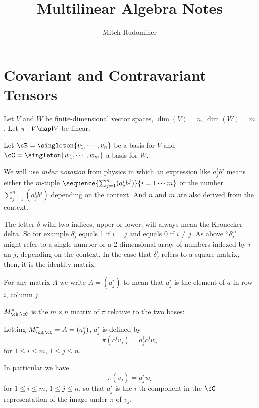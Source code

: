 \documentclass[oneside,12pt]{amsart}
\begin{document}
\title{Multilinear Algebra Notes}
\author{Mitch Rudominer}

\maketitle

\tableofcontents


\section{Covariant and Contravariant Tensors}

Let $V$ and $W$ be finite-dimensional vector spaces, 
$\dim(V)=n$, $\dim(W) = m$. Let $\pi:V\map W$ be linear.

Let $\cB = \singleton{v_1,\cdots,v_n}$ be a basis for $V$ and
$\cC=\singleton{w_1,\cdots,w_m}$ a basis for $W$.

We will use \emph{index notation} from physics in which an expression
like $a^i_j b^j$ means either the $m$-tuple 
$\sequence{\sum_{j=1}^n(a^i_j b^j)}{i=1\cdots m}$
or the number $\sum_{j=1}^n(a^i_j b^j)$ depending on the context. 
And $n$ and $m$ are also derived from the context.

The letter $\delta$ with two indices, upper or lower, will always mean the Kronecker delta. So for example $\delta^i_j$ equals 1 if $i=j$ and equals 0 if $i\neq j$. 
As above ``$\delta^i_j$" might refer to a single number or a 2-dimensional array
of numbers indexed by $i$ an $j$, depending on the context. In the case that
$\delta^i_j$ refers to a square matrix, then, it is the identity matrix.


\begin{definition}
 For any matrix $A$ we write $A=(a^i_j)$ to mean that $a^i_j$ is the
 element of $a$ in row $i$, column $j$. 
\end{definition}


\begin{definition}
$M^{\pi}_{\cB,\cC}$ is the $m\times n$ matrix of $\pi$ 
relative to the two bases:

 Letting $M^{\pi}_{\cB,\cC}=A=(a^i_j)$,
$a^i_j$ is defined by
$$\pi(c^jv_j) = a^i_j c^j w_i$$
for $1\leq i \leq m$, $1\leq j \leq n$.

In particular we have
$$\pi(v_j) = a^i_j  w_i$$
for $1\leq i \leq m$, $1\leq j \leq n$,
so that $a^i_j$ is the $i$-th component in the $\cC$-representation of the
image under $\pi$ of $v_j$.
\end{definition}
\end{document}
